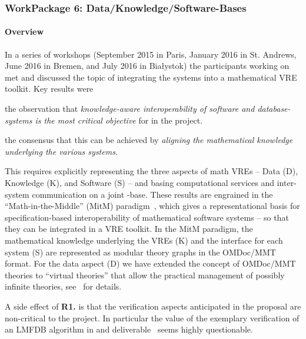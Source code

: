 \subsubsection{WorkPackage 6:  Data/Knowledge/Software-Bases}\label{dksbases}

\paragraph{Overview}

In a series of workshops (September 2015 in Paris, January 2016 in St. Andrews, June 2016 in Bremen, and July 2016 in Bia{\l}ystok) the participants working on  met and discussed the topic of integrating the \pn systems into a mathematical VRE toolkit.
Key results were
\begin{compactitem}[\bf R1.]
\item the observation that \emph{knowledge-aware interoperability of software and database-systems is the most critical objective} for  in the \pn project.
\item the consensus that this can be achieved by \emph{aligning the mathematical knowledge underlying the various systems}.
\end{compactitem}
This requires explicitly representing the three aspects of math VREs -- Data (D), Knowledge (K), and Software (S) -- and basing computational services and inter-system communication on a joint \DKS-base.
These results are engrained in the ``Math-in-the-Middle'' (MitM) paradigm~\cite{DehKohKon:iop16}, which gives a representational basis for specification-based interoperability of mathematical software systems -- so that they can be integrated in a VRE toolkit.
In the MitM paradigm, the mathematical knowledge underlying the VREs (K) and the interface for each system (S) are represented as modular theory graphs in the OMDoc/MMT format.
For the data aspect (D) we have extended the concept of OMDoc/MMT theories to ``virtual theories'' that allow the practical management of possibly infinite theories, see~\cite{ODK-D6.2} for details.

A side effect of \textbf{R1.} is that the verification aspects anticipated in the proposal are non-critical to the \pn project.
In particular the value of the exemplary verification of an LMFDB algorithm in  and deliverable~ seems highly questionable.

